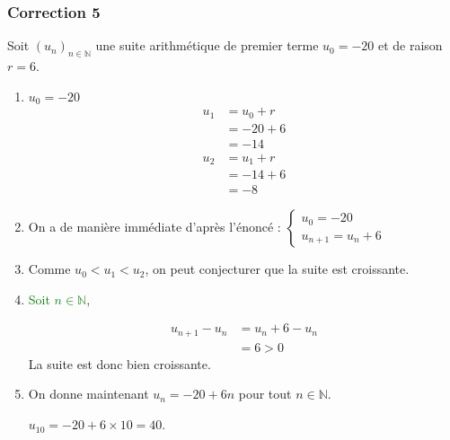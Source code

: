 \documentclass[15pt, mathserif]{beamer}
\newcommand{\N}{\mathbb{N}}			%
\newcommand{\st}[1]{$(#1_n)_{n \in \N}$}
\begin{document}
\begin{frame}
\vspace{-10mm}
	\frametitle{Correction 5}
Soit \st{u} une suite arithmétique de premier terme $u_0=-20$ et de raison $r=6$. 
 
 \begin{enumerate} 
 	 \item \begin{multicols}{3} 
 
 $u_0=-20$ 
 \columnbreak 
 \begin{align*} 
 u_1 &= u_0+r \\ 
 &= -20+6\\ 
 &= -14 
 \end{align*}  
 \columnbreak 
 \begin{align*} 
 u_2 &= u_1+r \\ 
 &= -14+6\\ 
 &= -8 
 \end{align*} 
 \end{multicols} 
 \vfil 
 	 \item On a de manière immédiate d'après l'énoncé : 
 \hfil$\begin{cases} 
 u_0=-20 \\ 
 u_{n+1}=u_n+6 
 \end{cases}$ 
 \vfil 
 	 \item Comme $u_0<u_1<u_2$, on peut conjecturer que la suite est croissante.
 \end{enumerate} 
 
 \end{frame} 
 
 \begin{frame}  
 \begin{enumerate} \setcounter{enumi}{3} 
 	 \item \textcolor{green}{Soit $n \in \N$}, 
 
  \begin{align*} 
 u_{n+1}-u_n &= u_n +6-u_n \\ 
 &= 6>0 
 \end{align*}La suite est donc bien croissante.
 \vfil 
 	 \item  On donne maintenant $u_n=-20+6n$ pour tout $n \in \N$. 
 
  \hfil$u_{10}=-20+6\times 10=40$. 
 
 \end{enumerate} \end{frame}
\end{document}
